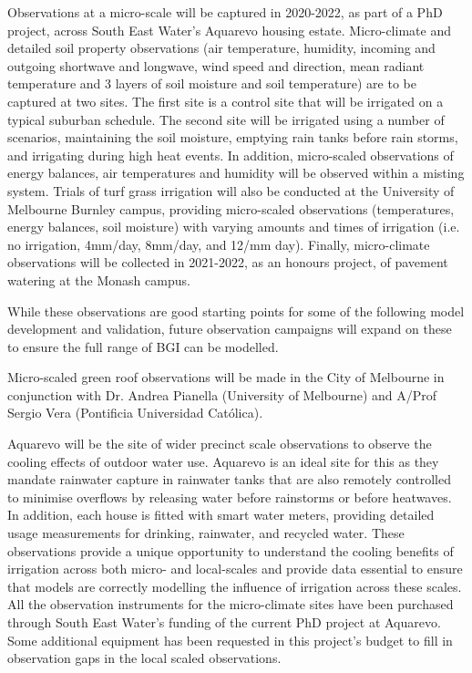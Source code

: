 Observations at a micro-scale will be captured in 2020-2022, as part of a PhD project, across South East Water's Aquarevo housing estate. Micro-climate and detailed soil property observations (air temperature, humidity, incoming and outgoing shortwave and longwave, wind speed and direction, mean radiant temperature and 3 layers of soil moisture and soil temperature) are  to be captured at two sites. The first site is a control site that will be irrigated on a typical suburban schedule. The second site will be irrigated using a number of scenarios, maintaining the soil moisture, emptying rain tanks before rain storms, and irrigating during high heat events. In addition, micro-scaled observations of energy balances, air temperatures and humidity will be observed within a misting system. Trials of turf grass irrigation will also be conducted at the University of Melbourne Burnley campus, providing micro-scaled observations (temperatures, energy balances, soil moisture) with varying amounts and times of irrigation (i.e. no irrigation, 4mm/day, 8mm/day, and 12/mm day). Finally, micro-climate observations will be collected in 2021-2022, as an honours project, of pavement watering at the Monash campus.

While these observations are good starting points for some of the following model development and validation, future observation campaigns will expand on these to ensure the full range of BGI can be modelled. 

Micro-scaled green roof observations will be made in the City of Melbourne in conjunction with Dr. Andrea Pianella (University of Melbourne) and A/Prof Sergio Vera (Pontificia Universidad Cat\'{o}lica). 

Aquarevo will be the site of wider precinct scale observations to observe the cooling effects of outdoor water use. Aquarevo is an ideal site for this as they mandate rainwater capture in rainwater tanks that are also remotely controlled to minimise overflows by releasing water before rainstorms or before heatwaves. In addition, each house is fitted with smart water meters, providing detailed usage measurements for drinking, rainwater, and recycled water. These observations provide a unique opportunity to understand the cooling benefits of irrigation across both micro- and local-scales and provide data essential to ensure that models are correctly modelling the influence of irrigation across these scales. All the observation instruments for the micro-climate sites have been purchased through South East Water's funding of the current PhD project at Aquarevo. Some additional equipment has been requested in this project's budget to fill in observation gaps in the local scaled observations.




